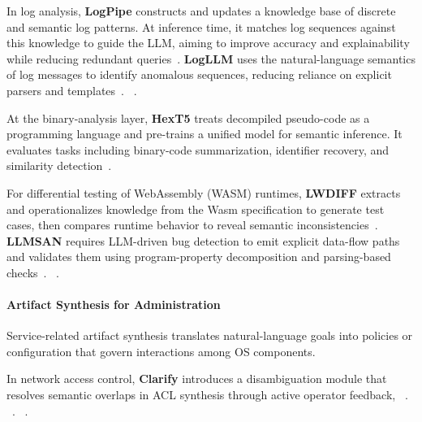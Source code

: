 In log analysis, \textbf{LogPipe} constructs and updates a knowledge base of discrete and semantic log patterns. At inference time, it matches log sequences against this knowledge to guide the LLM, aiming to improve accuracy and explainability while reducing redundant queries~\cite{tao2026knowledge}. \textbf{LogLLM} uses the natural-language semantics of log messages to identify anomalous sequences, reducing reliance on explicit parsers and templates~\cite{guan2024logllm}.
~.

At the binary-analysis layer, \textbf{HexT5} treats decompiled pseudo-code as a programming language and pre-trains a unified model for semantic inference. It evaluates tasks including binary-code summarization, identifier recovery, and similarity detection~\cite{xiong2023hext5}.

For differential testing of WebAssembly (WASM) runtimes, \textbf{LWDIFF} extracts and operationalizes knowledge from the Wasm specification to generate test cases, then compares runtime behavior to reveal semantic inconsistencies~\cite{zhou2025lwdiff}. \textbf{LLMSAN} requires LLM-driven bug detection to emit explicit data-flow paths and validates them using program-property decomposition and parsing-based checks~\cite{wang2024sanitizing}. ~.

\paragraph{Artifact Synthesis for Administration} 

Service-related artifact synthesis translates natural-language goals into policies or configuration that govern interactions among OS components.

In network access control, \textbf{Clarify} introduces a disambiguation module that resolves semantic overlaps in ACL synthesis through active operator feedback, ~\cite{mondal2025llm}.
~.
~.
